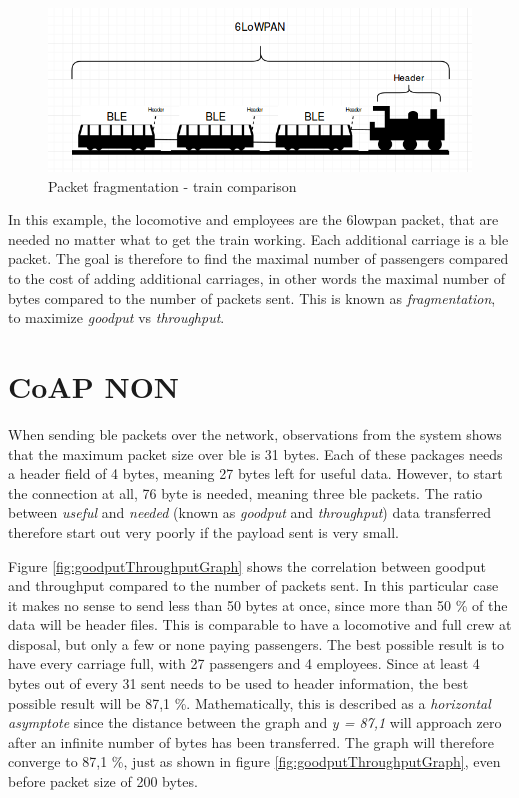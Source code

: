 \begin{figure}[ht]
    \centering
    \includegraphics[scale=0.5]{trainExample.png}    
    \caption{Packet fragmentation - train comparison}
    \label{fig:trainExample}
\end{figure}

In this example, the locomotive and employees are the \gls{6lowpan} packet, that are needed no matter what to get the train working. Each additional carriage is a \gls{ble} packet. The goal is therefore to find the maximal number of passengers compared to the cost of adding additional carriages, in other words the maximal number of bytes compared to the number of packets sent. This is known as \textit{fragmentation}, to maximize \textit{goodput} vs \textit{throughput}. 


\section{CoAP NON}

When sending \gls{ble} packets over the network, observations from the system shows that the maximum packet size over \gls{ble} is 31 bytes. Each of these packages needs a header field of 4 bytes, meaning 27 bytes left for useful data. However, to start the connection at all, 76 byte is needed, meaning three \gls{ble} packets. The ratio between \textit{useful} and \textit{needed} (known as \textit{goodput} and \textit{throughput}) data transferred therefore start out very poorly if the payload sent is very small. 

Figure \ref{fig:goodputThroughputGraph} shows the correlation between goodput and throughput compared to the number of packets sent. In this particular case it makes no sense to send less than 50 bytes at once, since more than 50 \% of the data will be header files. This is comparable to have a locomotive and full crew at disposal, but only a few or none paying passengers. The best possible result is to have every carriage full, with 27 passengers and 4 employees. Since at least 4 bytes out of every 31 sent needs to be used to header information, the best possible result will be 87,1 \%. Mathematically, this is described as a \textit{horizontal asymptote} since the distance between the graph and \textit{y = 87,1} will approach zero after an infinite number of bytes has been transferred. The graph will therefore converge to 87,1 \%, just as shown in figure \ref{fig:goodputThroughputGraph}, even before packet size of 200 bytes.  


